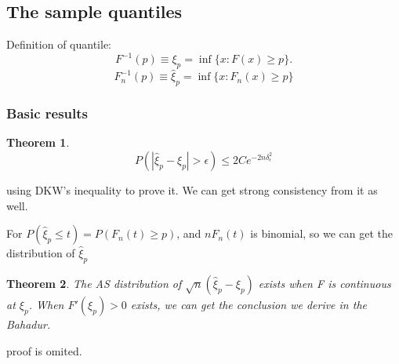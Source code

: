 \documentclass{ctexart}
\newtheorem{theorem}{Theorem}[subsection]
\begin{document}
\subsection{The sample quantiles}
Definition of quantile: 
\[
F ^{-1}(p)\equiv \xi_{p}=\inf \{x:F(x)\geq p\}.
\] 
\[
F_{n}^{-1}(p) \equiv \hat{\xi}_{p}=\inf\{x:F_{n}(x)\ge p\}
\] 
\subsubsection{Basic results}
\begin{theorem}
  \[
  P(|\hat{\xi}_{p}-\xi_{p}|>\epsilon)\le 2Ce^{-2n\delta_{\epsilon}^{2}}
  \] 
\end{theorem}
using DKW's inequality to prove it. We can get strong consistency from it as well.

For \(P(\hat{\xi}_{p}\le t)=P(F_{n}(t)\ge p)\), and \(nF_{n}(t)\) is binomial, so we can get the distribution of \(\hat{\xi}_{p}\)  

\begin{theorem}
  The AS distribution of \(\sqrt{n}(\hat{\xi}_{p}-\xi_{p})\) exists when F is continuous at \(\xi_{p}\). When \(F'(\xi_{p})>0\) exists, we can get the conclusion we derive in the Bahadur.
\end{theorem}
proof is omited. 
\end{document}
